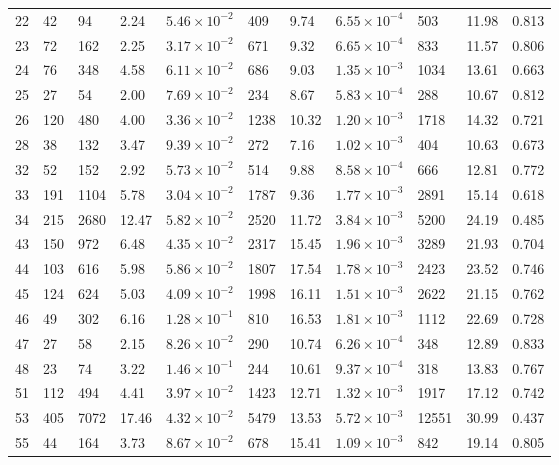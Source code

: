 \begin{table}[ht]
\begin{adjustbox}{width=\textwidth}
\begin{tabular}{lllllllllll}
  22 & 42 & 94 & 2.24 & $5.46 \times 10^{-2}$ & 409 & 9.74 & $6.55 \times 10^{-4}$ & 503 & 11.98 & 0.813 \\ 
  23 & 72 & 162 & 2.25 & $3.17 \times 10^{-2}$ & 671 & 9.32 & $6.65 \times 10^{-4}$ & 833 & 11.57 & 0.806 \\ 
  24 & 76 & 348 & 4.58 & $6.11 \times 10^{-2}$ & 686 & 9.03 & $1.35 \times 10^{-3}$ & 1034 & 13.61 & 0.663 \\ 
  25 & 27 & 54 & 2.00 & $7.69 \times 10^{-2}$ & 234 & 8.67 & $5.83 \times 10^{-4}$ & 288 & 10.67 & 0.812 \\ 
  26 & 120 & 480 & 4.00 & $3.36 \times 10^{-2}$ & 1238 & 10.32 & $1.20 \times 10^{-3}$ & 1718 & 14.32 & 0.721 \\ 
  28 & 38 & 132 & 3.47 & $9.39 \times 10^{-2}$ & 272 & 7.16 & $1.02 \times 10^{-3}$ & 404 & 10.63 & 0.673 \\ 
  32 & 52 & 152 & 2.92 & $5.73 \times 10^{-2}$ & 514 & 9.88 & $8.58 \times 10^{-4}$ & 666 & 12.81 & 0.772 \\ 
  33 & 191 & 1104 & 5.78 & $3.04 \times 10^{-2}$ & 1787 & 9.36 & $1.77 \times 10^{-3}$ & 2891 & 15.14 & 0.618 \\ 
  34 & 215 & 2680 & 12.47 & $5.82 \times 10^{-2}$ & 2520 & 11.72 & $3.84 \times 10^{-3}$ & 5200 & 24.19 & 0.485 \\ 
  43 & 150 & 972 & 6.48 & $4.35 \times 10^{-2}$ & 2317 & 15.45 & $1.96 \times 10^{-3}$ & 3289 & 21.93 & 0.704 \\ 
  44 & 103 & 616 & 5.98 & $5.86 \times 10^{-2}$ & 1807 & 17.54 & $1.78 \times 10^{-3}$ & 2423 & 23.52 & 0.746 \\ 
  45 & 124 & 624 & 5.03 & $4.09 \times 10^{-2}$ & 1998 & 16.11 & $1.51 \times 10^{-3}$ & 2622 & 21.15 & 0.762 \\ 
  46 & 49 & 302 & 6.16 & $1.28 \times 10^{-1}$ & 810 & 16.53 & $1.81 \times 10^{-3}$ & 1112 & 22.69 & 0.728 \\ 
  47 & 27 & 58 & 2.15 & $8.26 \times 10^{-2}$ & 290 & 10.74 & $6.26 \times 10^{-4}$ & 348 & 12.89 & 0.833 \\ 
  48 & 23 & 74 & 3.22 & $1.46 \times 10^{-1}$ & 244 & 10.61 & $9.37 \times 10^{-4}$ & 318 & 13.83 & 0.767 \\ 
  51 & 112 & 494 & 4.41 & $3.97 \times 10^{-2}$ & 1423 & 12.71 & $1.32 \times 10^{-3}$ & 1917 & 17.12 & 0.742 \\ 
  53 & 405 & 7072 & 17.46 & $4.32 \times 10^{-2}$ & 5479 & 13.53 & $5.72 \times 10^{-3}$ & 12551 & 30.99 & 0.437 \\ 
  55 & 44 & 164 & 3.73 & $8.67 \times 10^{-2}$ & 678 & 15.41 & $1.09 \times 10^{-3}$ & 842 & 19.14 & 0.805 \\ 

\end{tabular}
\end{adjustbox}
\end{table}
